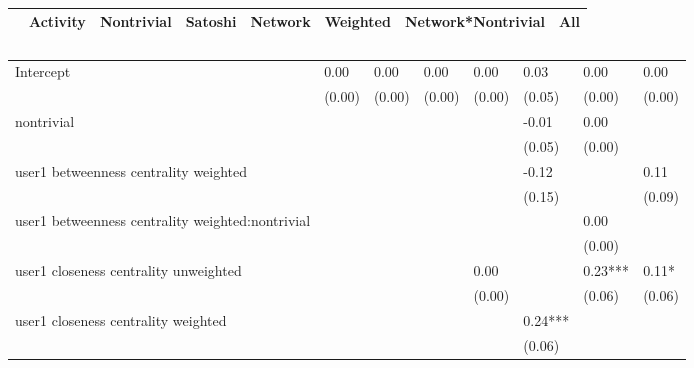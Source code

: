 \begin{table}
\caption{}
\begin{center}
\begin{tabular}{lccccccc}
\hline
                                                 & Activity & Nontrivial & Satoshi & Network & Weighted & Network*Nontrivial &   All     \\
\hline
\hline
\end{tabular}
\begin{tabular}{llllllll}
Intercept                                        & 0.00     & 0.00       & 0.00    & 0.00    & 0.03     & 0.00               & 0.00      \\
                                                 & (0.00)   & (0.00)     & (0.00)  & (0.00)  & (0.05)   & (0.00)             & (0.00)    \\
nontrivial                                       &          &            &         &         & -0.01    & 0.00               &           \\
                                                 &          &            &         &         & (0.05)   & (0.00)             &           \\
user1 betweenness centrality weighted            &          &            &         &         & -0.12    &                    & 0.11      \\
                                                 &          &            &         &         & (0.15)   &                    & (0.09)    \\
user1 betweenness centrality weighted:nontrivial &          &            &         &         &          & 0.00               &           \\
                                                 &          &            &         &         &          & (0.00)             &           \\
user1 closeness centrality unweighted            &          &            &         & 0.00    &          & 0.23***            & 0.11*     \\
                                                 &          &            &         & (0.00)  &          & (0.06)             & (0.06)    \\
user1 closeness centrality weighted              &          &            &         &         & 0.24***  &                    &           \\
                                                 &          &            &         &         & (0.06)   &                    &           \\

\end{tabular}
\end{center}
\end{table}
